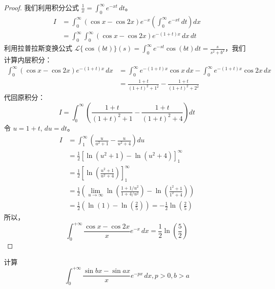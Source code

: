 \documentclass[lang=cn,10pt,thmcnt=section]{elegantbook}
\begin{document}
\begin{proof}
	我们利用积分公式 $\frac{1}{x} = \int_{0}^{\infty} e^{-xt} \, dt$。
\begin{align*}
I &= \int_{0}^{\infty} (\cos x - \cos 2x)e^{-x} \left( \int_{0}^{\infty} e^{-xt} \, dt \right) dx \\
&= \int_{0}^{\infty} \int_{0}^{\infty} (\cos x - \cos 2x)e^{-(1+t)x} \, dx \, dt
\end{align*}
利用拉普拉斯变换公式 $\mathcal{L}\{\cos(bt)\}(s) = \int_0^\infty e^{-st}\cos(bt)dt = \frac{s}{s^2+b^2}$，我们计算内层积分：
\begin{align*}
\int_{0}^{\infty} (\cos x - \cos 2x)e^{-(1+t)x} \, dx &= \int_{0}^{\infty} e^{-(1+t)x}\cos x \, dx - \int_{0}^{\infty} e^{-(1+t)x}\cos 2x \, dx \\
&= \frac{1+t}{(1+t)^2+1^2} - \frac{1+t}{(1+t)^2+2^2}
\end{align*}
代回原积分：
\[ I = \int_{0}^{\infty} \left( \frac{1+t}{(1+t)^2+1} - \frac{1+t}{(1+t)^2+4} \right) dt \]
令 $u=1+t$, $du=dt$。
\begin{align*}
I &= \int_{1}^{\infty} \left( \frac{u}{u^2+1} - \frac{u}{u^2+4} \right) du \\
&= \frac{1}{2} \left[ \ln(u^2+1) - \ln(u^2+4) \right]_{1}^{\infty} \\
&= \frac{1}{2} \left[ \ln\left(\frac{u^2+1}{u^2+4}\right) \right]_{1}^{\infty} \\
&= \frac{1}{2} \left( \lim_{u\to\infty} \ln\left(\frac{1+1/u^2}{1+4/u^2}\right) - \ln\left(\frac{1^2+1}{1^2+4}\right) \right) \\
&= \frac{1}{2} \left( \ln(1) - \ln\left(\frac{2}{5}\right) \right) = -\frac{1}{2}\ln\left(\frac{2}{5}\right)
\end{align*}
所以，
\[ \int_{0}^{+\infty}\frac{\cos x-\cos 2x}{x}e^{-x} \,dx = \frac{1}{2}\ln\left(\frac{5}{2}\right) \]

\end{proof}
\begin{example}
	计算
	\[\int_{0}^{+\infty}\frac{\sin bx-\sin ax}{x}e^{-px}  \,dx ,p>0,b>a
	\]
\end{example}
\end{document}
